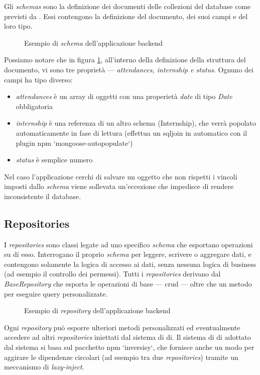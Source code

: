 Gli \textit{schemas} sono la definizione dei documenti delle collezioni del database come previsti da \mongoosejs. Essi contengono la definizione del documento, dei suoi campi e del loro tipo.
\begin{figure}[!h] 
	\centering    
	
	\caption[Esempio di \textit{schema} dell'applicazione \gls{backend}]{Esempio di \textit{schema} dell'applicazione \gls{backend}}
	\label{fig:server-schema}
\end{figure}
Possiamo notare che in figura \ref{fig:server-schema}, all'interno della definizione della struttura del documento, vi sono tre proprietà --- \textit{attendances, internship e status}. Ognuno dei campi ha tipo diverso:
\begin{itemize}
	\item \textit{attendances} è un array di oggetti con una properietà \textit{date} di tipo \textit{Date} obbligatoria
	\item \textit{internship} è una referenza di un altro schema (Internship), che verrà popolato automaticamente in fase di lettura (effettua un \gls{sqljoin} in automatico con il plugin \acrshort{npm} `mongoose-autopopulate`)
	\item \textit{status} è semplice numero
\end{itemize}
Nel caso l'applicazione cerchi di salvare un oggetto che non rispetti i vincoli imposti dallo \textit{schema} viene sollevata un'eccezione che impedisce di rendere inconsistente il database.

\subsection{Repositories}
I \textit{repositories} sono classi legate ad uno specifico \textit{schema} che esportano operazioni su di esso. Interrogano il proprio \textit{schema} per leggere, scrivere o aggregare dati, e contengono solamente la logica di accesso ai dati, senza nessuna logica di business (ad esempio il controllo dei permessi). Tutti i \textit{repositories} derivano dal \textit{BaseRepository} che esporta le operazioni di base --- \gls{crud} --- oltre che un metodo per eseguire query personalizzate.
\begin{figure}[!h] 
	\centering    
	
	\caption[Esempio di \textit{Repository}]{Esempio di \textit{repository} dell'applicazione \gls{backend}}
	\label{fig:server-repository}
\end{figure}
Ogni \textit{repository} può esporre ulteriori metodi personalizzati ed eventualmente accedere ad altri \textit{repositories} iniettati dal sistema di \acrfull{di}. Il sistema di \acrshort{di} adottato dal sistema si basa sul pacchetto \acrshort{npm} `inversisy`, che fornisce anche un modo per aggirare le dipendenze circolari (ad esempio tra due \textit{repositories}) tramite un meccanismo di \textit{lazy-inject}.

